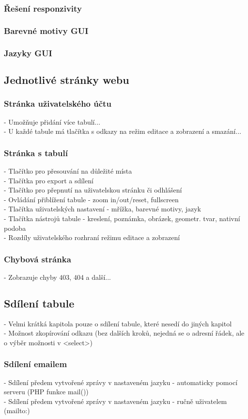 \subsubsection{Řešení responzivity}


\subsubsection{Barevné motivy GUI}


\subsubsection{Jazyky GUI}



\subsection{Jednotlivé stránky webu}
\subsubsection{Stránka uživatelského účtu}
- Umožňuje přidání více tabulí...\\
- U každé tabule má tlačítka s odkazy na režim editace a zobrazení a smazání...


\subsubsection{Stránka s tabulí}
- Tlačítko pro přesouvání na důležité místa\\
- Tlačítka pro export a sdílení\\
- Tlačítko pro přepnutí na uživatelskou stránku či odhlášení\\
- Ovládání přiblížení tabule - zoom in/out/reset, fullscreen\\
- Tlačítka uživatelských nastavení - mřížka, barevné motivy, jazyk\\
- Tlačítka nástrojů tabule - kreslení, poznámka, obrázek, geometr. tvar, nativní podoba\\
- Rozdíly uživatelského rozhraní režimu editace a zobrazení


\subsubsection{Chybová stránka}
- Zobrazuje chyby 403, 404 a další...



\subsection{Sdílení tabule}
- Velmi krátká kapitola pouze o sdílení tabule, které nesedí do jiných kapitol\\
- Možnost zkopírování odkazu (bez dalších kroků, nejedná se o adresní řádek, ale o výběr možnosti v <select>)


\subsubsection{Sdílení emailem}
- Sdílení předem vytvořené zprávy v nastaveném jazyku - automaticky pomocí serveru (PHP funkce mail())\\
- Sdílení předem vytvořené zprávy v nastaveném jazyku - ručně uživatelem (mailto:)
\endinput